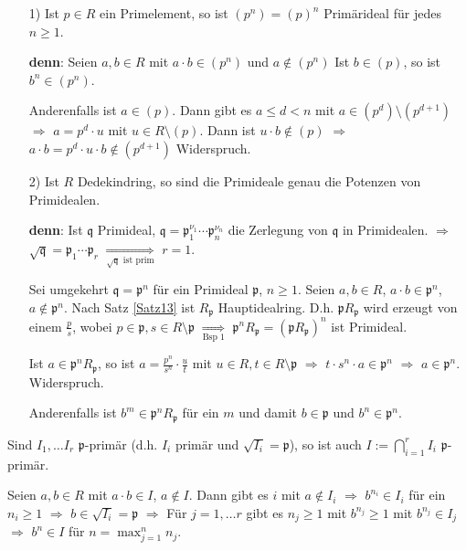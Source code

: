 \begin{nnBsp}
\begin{enumerate}
\item[1)] Ist $p \in R$ ein Primelement, so ist $(p^n) = (p)^n$ Primärideal für jedes $n \geq 1$.

\textbf{denn}: Seien $a, b \in R$ mit $a \cdot b \in (p^n)$ und $a \notin (p^n)$ Ist $b \in (p)$, so ist $b^n \in (p^n)$.

Anderenfalls ist $a \in (p)$. Dann gibt es $a \leq d < n$ mit $a \in (p^d) \setminus (p^{d+1})$ $\Rightarrow$ $a = p^d \cdot u$ mit $u \in R \setminus (p)$. Dann ist $u \cdot b \notin (p)$ $\Rightarrow$ $a \cdot b = p^d \cdot u \cdot b \notin (p^{d+1})$ Widerspruch.

\item[2)] Ist $R$ Dedekindring, so sind die Primideale genau die Potenzen von Primidealen.

\textbf{denn}: Ist $\mathfrak{q}$ Primideal, $\mathfrak{q} = \mathfrak{p}_1^{\nu_1} \cdots \mathfrak{p}_n^{\nu_n}$ die Zerlegung von $\mathfrak{q}$ in Primidealen. $\Rightarrow$ $\sqrt{\mathfrak{q}} = \mathfrak{p}_1 \cdots \mathfrak{p}_r$ $\underset{\sqrt{\mathfrak{q}}\text{ ist prim}}\Rightarrow$ $r=1$.

Sei umgekehrt $\mathfrak{q} = \mathfrak{p}^n$ für ein Primideal $\mathfrak{p}$, $n \geq 1$. Seien $a, b \in R$, $a \cdot b \in \mathfrak{p}^n$, $a \notin \mathfrak{p}^n$. Nach Satz \ref{Satz13} ist $R_\mathfrak{p}$ Hauptidealring. D.h. $\mathfrak{p} R_\mathfrak{p}$ wird erzeugt von einem $\frac{p}{s}$, wobei $p \in \mathfrak{p}, s \in R \setminus \mathfrak{p}$ $\underset{\text{Bsp 1}}\Rightarrow$ $\mathfrak{p}^n R_\mathfrak{p} = (\mathfrak{p} R_\mathfrak{p})^n$ ist Primideal.

Ist $a \in \mathfrak{p}^n R_\mathfrak{p}$, so ist $a = \frac{p^n}{s^n} \cdot \frac{u}{t}$ mit $u \in R, t \in R \setminus \mathfrak{p}$ $\Rightarrow$ $t \cdot s^n \cdot a \in \mathfrak{p}^n$ $\Rightarrow$ $a \in \mathfrak{p}^n$. Widerspruch.

Anderenfalls ist $b^m \in \mathfrak{p}^n R_\mathfrak{p}$ für ein $m$ und damit $b \in \mathfrak{p}$ und $b^n \in \mathfrak{p}^n$.

\end{enumerate}
\end{nnBsp}

\begin{Bem}
Sind $I_1, \ldots I_r$ $\mathfrak{p}$-primär (d.h. $I_i$ primär und $\sqrt{I_i} = \mathfrak{p}$), so ist auch $I := \displaystyle\bigcap_{i=1}^{r} I_i$ $\mathfrak{p}$-primär.

\begin{Bew}
Seien $a,b \in R$ mit $a \cdot b \in I$, $a \notin I$. Dann gibt es $i$ mit $a \notin I_i$ $\Rightarrow$ $b^{n_i} \in I_i$ für ein $n_i \geq 1$ $\Rightarrow$ $b \in \sqrt{I_i} = \mathfrak{p}$ $\Rightarrow$ Für $j = 1, \ldots r$ gibt es $n_j \geq 1$ mit $b^{n_j} \geq 1$ mit $b^{n_j} \in I_j$ $\Rightarrow$ $b^n \in I$ für $n = \max_{j=1}^{n} n_j$.

\end{Bew}
\end{Bem}

